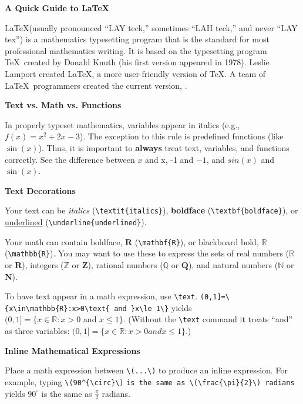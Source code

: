 \documentclass[10pt,landscape]{article}
\newcommand{\ColorSection}[1]{\par\vspace{1.5ex}\noindent\textcolor{sectioncolor}{\Large\bfseries #1}\par\vspace{0.75ex}}
\newcommand{\ColorSubsection}[1]{\par\vspace{1ex}\noindent\textcolor{subsectioncolor}{\normalsize\bfseries #1}\par\vspace{0.5ex}}
\begin{document}
\raggedright
\footnotesize


\begin{center}
\textcolor{titlecolor}{\Huge\bfseries A Quick Guide to \LaTeX}
\end{center}
\begin{multicols}{3}
\setlength{\premulticols}{1pt}
\setlength{\postmulticols}{1pt}
\setlength{\multicolsep}{1pt}
\setlength{\columnsep}{2pt}


\begin{tcolorbox}[notebox, title=What is \LaTeX?]
\LaTeX (usually pronounced ``LAY teck,'' sometimes ``LAH teck,'' and never ``LAY tex'') is a mathematics typesetting program that is the standard for most professional mathematics writing. It is based on the typesetting program \TeX\ created by Donald Knuth (his first version appeared in 1978). Leslie Lamport created \LaTeX, a more user-friendly version of \TeX. A team of \LaTeX\ programmers created the current version,  \LaTeXe.
\end{tcolorbox}



\ColorSection{Text vs. Math vs. Functions}
In properly typeset mathematics, variables appear in italics (e.g., \(f(x)=x^{2}+2x-3\)). The exception to this rule is predefined functions (like \(\sin (x)\)). Thus, it is important to \textbf{always} treat text, variables, and functions correctly. See the difference between \(x\) and x, -1 and \(-1\), and \(sin(x)\) and \(\sin(x)\).  

\ColorSubsection{Text Decorations}
Your text can be \textit{italics} (\verb!\textit{italics}!), \textbf{boldface} (\verb!\textbf{boldface}!), or \underline{underlined} (\verb!\underline{underlined}!).

Your math can contain boldface, \(\mathbf{R}\) (\verb!\mathbf{R}!), or blackboard bold, \(\mathbb{R}\) (\verb!\mathbb{R}!). You may want to use these to express the sets of real numbers (\(\mathbb{R}\) or \(\mathbf{R}\)), integers (\(\mathbb{Z}\) or \(\mathbf{Z}\)), rational numbers (\(\mathbb{Q}\) or \(\mathbf{Q}\)), and natural numbers (\(\mathbb{N}\) or \(\mathbf{N}\)).

To have text appear in a math expression, use \verb!\text!. \verb!(0,1]=\{x\in\mathbb{R}:x>0\text{ and }x\le 1\}! yields \((0,1]=\{x\in\mathbb{R}:x>0\text{ and }x\le 1\}\). (Without the \verb!\text! command it treats ``and'' as three variables: \((0,1]=\{x\in\mathbb{R}:x>0 and x\le 1\}\).)

\ColorSubsection{Inline Mathematical Expressions}
Place a math expression between \verb!\(...\)! to produce an inline expression.  For example, typing \verb!\(90^{\circ}\)! \verb!is the same as \(\frac{\pi}{2}\) radians!  yields \(90^{\circ}\) is the same as \(\frac{\pi}{2}\) radians.


\end{multicols}
\end{document}
